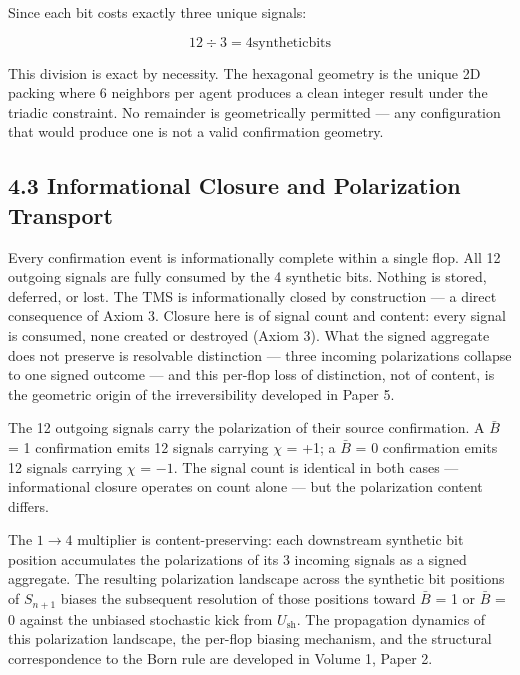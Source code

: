 \documentclass[11pt,oneside]{report}
\theoremstyle{definition}
\theoremstyle{remark}
\begin{document}
Since each bit costs exactly three unique signals:

\begin{equation*}
12 \div 3 = 4 \text{synthetic} \text{bits}
\end{equation*}

This division is exact by necessity. The hexagonal geometry is the
unique 2D packing where 6 neighbors per agent produces a clean integer
result under the triadic constraint. No remainder is geometrically
permitted --- any configuration that would produce one is not a valid
confirmation geometry.

\subsection*{4.3 Informational Closure and Polarization Transport}

Every confirmation event is informationally complete within a single
flop. All 12 outgoing signals are fully consumed by the 4 synthetic
bits. Nothing is stored, deferred, or lost. The TMS is informationally
closed by construction --- a direct consequence of Axiom 3. Closure here
is of signal count and content: every signal is consumed, none created or
destroyed (Axiom 3). What the signed aggregate does not preserve is
resolvable distinction --- three incoming polarizations collapse to one
signed outcome --- and this per-flop loss of distinction, not of content,
is the geometric origin of the irreversibility developed in Paper 5.

The 12 outgoing signals carry the polarization of their source
confirmation. A \ensuremath{\bar{B}} = 1 confirmation emits 12 signals carrying \ensuremath{\chi} = +1; a \ensuremath{\bar{B}}
= 0 confirmation emits 12 signals carrying \ensuremath{\chi} = \ensuremath{-1.} The signal count is
identical in both cases --- informational closure operates on count
alone --- but the polarization content differs.

The \ensuremath{1\to 4} multiplier is content-preserving: each downstream synthetic bit
position accumulates the polarizations of its 3 incoming signals as a
signed aggregate. The resulting polarization landscape across the
synthetic bit positions of \ensuremath{S_{n+1}} biases the subsequent resolution of
those positions toward \ensuremath{\bar{B}} = 1 or \ensuremath{\bar{B}} = 0 against the unbiased stochastic
kick from \ensuremath{U_{\mathrm{sh}}.} The propagation dynamics of this polarization landscape,
the per-flop biasing mechanism, and the structural correspondence to the
Born rule are developed in Volume 1, Paper 2.
\end{document}
